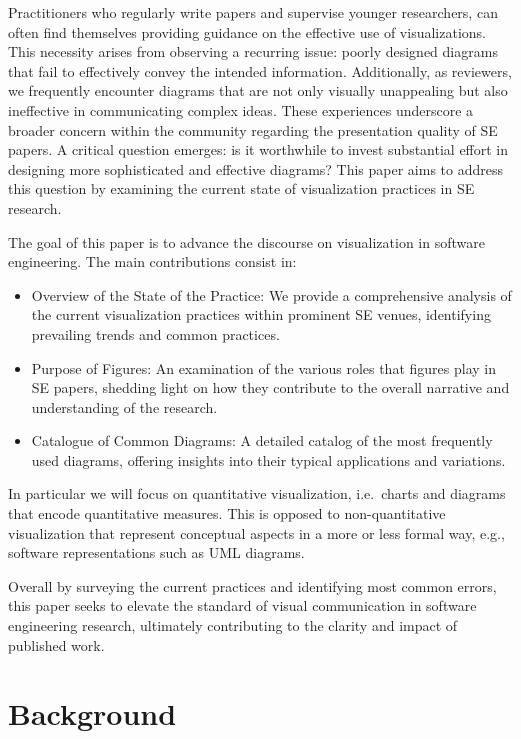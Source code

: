 \documentclass[
  10pt,
  conference,
]{IEEEtran}%
\providecommand{\tightlist}{%
  \setlength{\itemsep}{0pt}\setlength{\parskip}{0pt}}
\begin{document}
Practitioners who regularly write papers and supervise younger
researchers, can often find themselves providing guidance on the
effective use of visualizations. This necessity arises from observing a
recurring issue: poorly designed diagrams that fail to effectively
convey the intended information. Additionally, as reviewers, we
frequently encounter diagrams that are not only visually unappealing but
also ineffective in communicating complex ideas. These experiences
underscore a broader concern within the community regarding the
presentation quality of SE papers. A critical question emerges: is it
worthwhile to invest substantial effort in designing more sophisticated
and effective diagrams? This paper aims to address this question by
examining the current state of visualization practices in SE research.

The goal of this paper is to advance the discourse on visualization in
software engineering. The main contributions consist in:

\begin{itemize}
\tightlist
\item
  Overview of the State of the Practice: We provide a comprehensive
  analysis of the current visualization practices within prominent SE
  venues, identifying prevailing trends and common practices.
\item
  Purpose of Figures: An examination of the various roles that figures
  play in SE papers, shedding light on how they contribute to the
  overall narrative and understanding of the research.
\item
  Catalogue of Common Diagrams: A detailed catalog of the most
  frequently used diagrams, offering insights into their typical
  applications and variations.
\end{itemize}

In particular we will focus on quantitative visualization, i.e.~charts
and diagrams that encode quantitative measures. This is opposed to
non-quantitative visualization that represent conceptual aspects in a
more or less formal way, e.g., software representations such as UML
diagrams.

Overall by surveying the current practices and identifying most common
errors, this paper seeks to elevate the standard of visual communication
in software engineering research, ultimately contributing to the clarity
and impact of published work.

\section{Background}\label{background}
\end{document}
